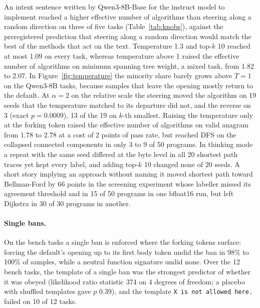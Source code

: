 \documentclass[11pt,letterpaper]{article}
\begin{document}
An intent sentence written by Qwen3-8B-Base for the instruct model to implement reached a higher effective number of algorithms than steering along a random direction on three of five tasks (Table~\ref{tab:knobs}), against the preregistered prediction that steering along a random direction would match the best of the methods that act on the text. Temperature 1.3 and top-$k$ 10 reached at most 1.09 on every task, whereas temperature above 1 raised the effective number of algorithms on minimum spanning tree weight, a mixed task, from 1.82 to 2.07. In Figure~\ref{fig:temperature} the minority share barely grows above $T = 1$ on the Qwen3-8B tasks, because samples that leave the opening mostly return to the default. At $\alpha = 2$ on the relative scale the steering moved the algorithm on 19 seeds that the temperature matched to its departure did not, and the reverse on 3 (exact $p = 0.0009$), 13 of the 19 on $k$-th smallest. Raising the temperature only at the forking token raised the effective number of algorithms on valid anagram from 1.78 to 2.78 at a cost of 2 points of pass rate, but reached DFS on the collapsed connected components in only 3 to 9 of 50 programs. In thinking mode a repeat with the same seed differed at the byte level in all 20 shortest path traces yet kept every label, and adding top-$k$ 10 changed none of 20 seeds. A short story implying an approach without naming it moved shortest path toward Bellman-Ford by 66 points in the screening experiment whose labeller missed its agreement threshold and in 15 of 50 programs in one bfloat16 run, but left Dijkstra in 30 of 30 programs in another.

\paragraph{Single bans.} On the bench tasks a single ban is enforced where the forking tokens surface: forcing the default's opening up to its first body token undid the ban in 98\% to 100\% of samples, while a neutral function signature undid none. Over the 12 bench tasks, the template of a single ban was the strongest predictor of whether it was obeyed (likelihood ratio statistic 374 on 4 degrees of freedom; a placebo with shuffled templates gave $p$ 0.39), and the template \texttt{X is not allowed here.} failed on 10 of 12 tasks.
\end{document}
